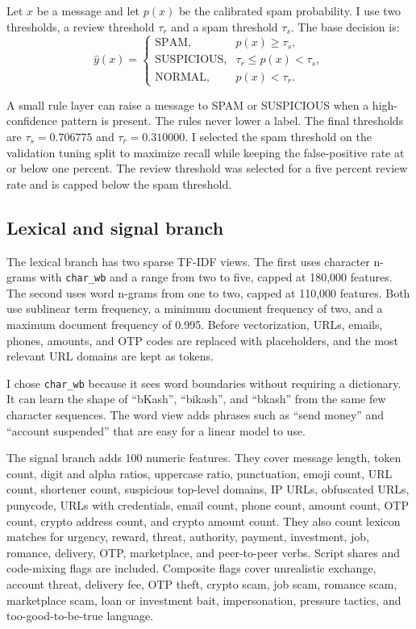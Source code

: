 \documentclass[11pt]{article}
\begin{document}
Let $x$ be a message and let $p(x)$ be the calibrated spam probability. I use two thresholds, a review threshold $\tau_r$ and a spam threshold $\tau_s$. The base decision is:
\begin{equation}
\hat{y}(x)=
\begin{cases}
\text{SPAM}, & p(x) \geq \tau_s,\\
\text{SUSPICIOUS}, & \tau_r \leq p(x) < \tau_s,\\
\text{NORMAL}, & p(x) < \tau_r.
\end{cases}
\end{equation}

A small rule layer can raise a message to SPAM or SUSPICIOUS when a high-confidence pattern is present. The rules never lower a label. The final thresholds are $\tau_s = 0.706775$ and $\tau_r = 0.310000$. I selected the spam threshold on the validation tuning split to maximize recall while keeping the false-positive rate at or below one percent. The review threshold was selected for a five percent review rate and is capped below the spam threshold.

\subsection{Lexical and signal branch}

The lexical branch has two sparse TF-IDF views. The first uses character n-grams with \texttt{char\_wb} and a range from two to five, capped at 180,000 features. The second uses word n-grams from one to two, capped at 110,000 features. Both use sublinear term frequency, a minimum document frequency of two, and a maximum document frequency of 0.995. Before vectorization, URLs, emails, phones, amounts, and OTP codes are replaced with placeholders, and the most relevant URL domains are kept as tokens.

I chose \texttt{char\_wb} because it sees word boundaries without requiring a dictionary. It can learn the shape of ``bKash'', ``bikash'', and ``bkash'' from the same few character sequences. The word view adds phrases such as ``send money'' and ``account suspended'' that are easy for a linear model to use.

The signal branch adds 100 numeric features. They cover message length, token count, digit and alpha ratios, uppercase ratio, punctuation, emoji count, URL count, shortener count, suspicious top-level domains, IP URLs, obfuscated URLs, punycode, URLs with credentials, email count, phone count, amount count, OTP count, crypto address count, and crypto amount count. They also count lexicon matches for urgency, reward, threat, authority, payment, investment, job, romance, delivery, OTP, marketplace, and peer-to-peer verbs. Script shares and code-mixing flags are included. Composite flags cover unrealistic exchange, account threat, delivery fee, OTP theft, crypto scam, job scam, romance scam, marketplace scam, loan or investment bait, impersonation, pressure tactics, and too-good-to-be-true language.
\end{document}
